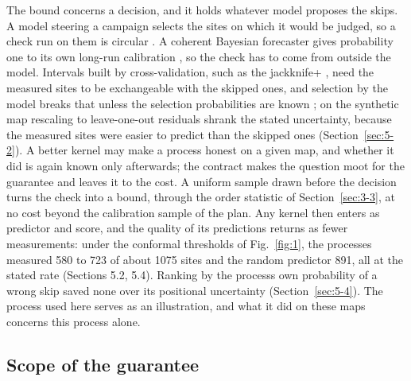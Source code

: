 \documentclass{iopjournal}
\begin{document}
The bound concerns a decision, and it holds whatever model proposes the skips. A model steering a campaign selects the sites on which it would be judged, so a check run on them is circular \cite{Kriegeskorte2009}. A coherent Bayesian forecaster gives probability one to its own long-run calibration \cite{Dawid1982}, so the check has to come from outside the model. Intervals built by cross-validation, such as the jackknife+ \cite{Barber2021}, need the measured sites to be exchangeable with the skipped ones, and selection by the model breaks that unless the selection probabilities are known \cite{Fannjiang2022,ZrnicCandes2024}; on the synthetic map rescaling to leave-one-out residuals shrank the stated uncertainty, because the measured sites were easier to predict than the skipped ones (Section~\ref{sec:5-2}). A better kernel may make a process honest on a given map, and whether it did is again known only afterwards; the contract makes the question moot for the guarantee and leaves it to the cost. A uniform sample drawn before the decision turns the check into a bound, through the order statistic of Section~\ref{sec:3-3}, at no cost beyond the calibration sample of the plan. Any kernel then enters as predictor and score, and the quality of its predictions returns as fewer measurements: under the conformal thresholds of Fig.~\ref{fig:1}, the processes measured 580 to 723 of about 1075 sites and the random predictor 891, all at the stated rate (Sections 5.2, 5.4). Ranking by the process\textquotesingle s own probability of a wrong skip saved none over its positional uncertainty (Section~\ref{sec:5-4}). The process used here serves as an illustration, and what it did on these maps concerns this process alone.

\hypertarget{scope-of-the-guarantee}{%
\subsection{Scope of the guarantee}\label{scope-of-the-guarantee}}
\end{document}
